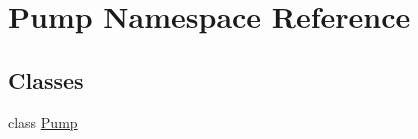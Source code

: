 \hypertarget{namespace_pump}{}\section{Pump Namespace Reference}
\label{namespace_pump}
\subsection*{Classes}
\begin{DoxyCompactItemize}
\item 
class \hyperlink{class_pump_1_1_pump}{Pump}
\end{DoxyCompactItemize}
